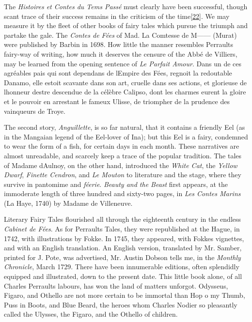 \documentclass[14pt,a4paper]{memoir}
\begin{document}
The \emph{Histoires et Contes du Tems Passé} must clearly have been
successful, though scant trace of their success remains in the criticism
of the
time\protect\hypertarget{4533318093929944247_33931-h-0.htm.xhtmlux5cux23FNanchor_22}{}{}\protect\hyperlink{4533318093929944247_33931-h-0.htm.xhtmlux5cux23Footnote_22}{{[}22{]}}.
We may measure it by the fleet of other books of fairy tales which
\textquotesingle pursue the triumph and partake the
gale.\textquotesingle{} The \emph{Contes de Fées} of Mad. La Comtesse de
M------ (Murat) were published by Barbin in 1698. How little the manner
resembles Perrault\textquotesingle s \textquotesingle fairy-way of
writing,\textquotesingle{} how much it deserves the censure of the Abbé
de Villiers, may be learned from the opening sentence of \emph{Le
Parfait Amour}. \textquotesingle Dans un de ces agréables pais qui sont
dependans de l\textquotesingle Empire des Fées, regnoit la redoutable
Danamo, elle estoit scavante dans son art, cruelle dans ses actions, et
glorieuse de l\textquotesingle honneur d\textquotesingle estre descendue
de la célèbre Calipso, dont les charmes eurent la gloire et le pouvoir
en arrestant le fameux Ulisse, de triompher de la prudence des
vainqueurs de Troye.\textquotesingle{}

The second story, \emph{Anguillette}, is so far natural, that it
contains a friendly Eel (as in the Mangaian legend of the Eel-lover of
Ina); but this Eel is a fairy, condemned to wear the form of a fish, for
certain days in each month. These narratives are almost unreadable, and
scarcely keep a trace of the popular tradition. The tales of Madame
d\textquotesingle Aulnoy, on the other hand, introduced the \emph{White
Cat}, the \emph{Yellow Dwarf}, \emph{Finette Cendron}, and \emph{Le
Mouton} to literature and the stage, where they survive in pantomime and
\emph{féerie}. \emph{Beauty and the Beast} first appears, at the
immoderate length of three hundred and sixty-two pages, in \emph{Les
Contes Marins} (La Haye, 1740) by Madame de Villeneuve.

Literary Fairy Tales flourished all through the eighteenth century in
the endless \emph{Cabinet de Fées}. As for Perrault\textquotesingle s
Tales, they were republished at the Hague, in 1742, with illustrations
by Fokke. In 1745, they appeared, with Fokke\textquotesingle s
vignettes, and with an English translation. An English version,
translated by Mr. Samber, printed for J. Pote, was advertised, Mr.
Austin Dobson tells me, in the \emph{Monthly Chronicle}, March 1729.
There have been innumerable editions, often splendidly equipped and
illustrated, down to the present date. This little book alone, of all
Charles Perrault\textquotesingle s labours, has won \textquotesingle the
land of matters unforgot.\textquotesingle{} Odysseus, Figaro, and
Othello are not more certain to be immortal than Hop o\textquotesingle{}
my Thumb, Puss in Boots, and Blue Beard, the heroes whom Charles Nodier
so pleasantly called \textquotesingle the Ulysses, the Figaro, and the
Othello of children.\textquotesingle{}
\end{document}
